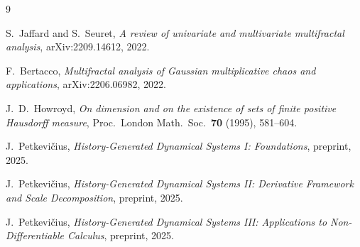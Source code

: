 \documentclass[11pt,a4paper]{article}
\theoremstyle{definition}
\theoremstyle{remark}
\begin{document}
\begin{thebibliography}{9}

S.~Jaffard and S.~Seuret,
\textit{A review of univariate and multivariate multifractal analysis},
arXiv:2209.14612, 2022.

F.~Bertacco,
\textit{Multifractal analysis of Gaussian multiplicative chaos and
applications},
arXiv:2206.06982, 2022.

J.~D.~Howroyd,
\textit{On dimension and on the existence of sets of finite positive
Hausdorff measure},
Proc.\ London Math.\ Soc.\ \textbf{70} (1995), 581--604.

J.~Petkevi\v{c}ius,
\textit{History-Generated Dynamical Systems I: Foundations},
preprint, 2025.

J.~Petkevi\v{c}ius,
\textit{History-Generated Dynamical Systems II: Derivative Framework
and Scale Decomposition},
preprint, 2025.

J.~Petkevi\v{c}ius,
\textit{History-Generated Dynamical Systems III: Applications to
Non-Differentiable Calculus},
preprint, 2025.

\end{thebibliography}
\end{document}
